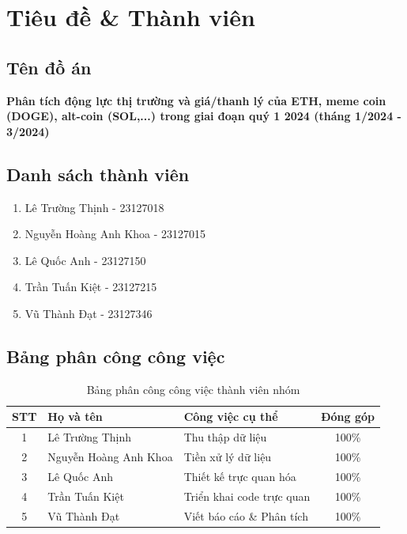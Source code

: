 \section{Tiêu đề \& Thành viên}

\subsection{Tên đồ án}
\textbf{Phân tích động lực thị trường và giá/thanh lý của ETH, meme coin (DOGE), alt-coin (SOL,...) trong giai đoạn quý 1 2024 (tháng 1/2024 - 3/2024)}

\subsection{Danh sách thành viên}
\begin{enumerate}
    \item Lê Trường Thịnh - 23127018
    \item Nguyễn Hoàng Anh Khoa - 23127015
    \item Lê Quốc Anh - 23127150
    \item Trần Tuấn Kiệt - 23127215
    \item Vũ Thành Đạt - 23127346
\end{enumerate}

\subsection{Bảng phân công công việc}
\begin{table}[H]
\centering
\begin{tabular}{|c|l|l|c|}
\hline
\textbf{STT} & \textbf{Họ và tên} & \textbf{Công việc cụ thể} & \textbf{Đóng góp} \\ \hline
1 & Lê Trường Thịnh & Thu thập dữ liệu & 100\% \\ \hline
2 & Nguyễn Hoàng Anh Khoa & Tiền xử lý dữ liệu & 100\% \\ \hline
3 & Lê Quốc Anh & Thiết kế trực quan hóa & 100\% \\ \hline
4 & Trần Tuấn Kiệt & Triển khai code trực quan & 100\% \\ \hline
5 & Vũ Thành Đạt & Viết báo cáo \& Phân tích & 100\% \\ \hline
\end{tabular}
\caption{Bảng phân công công việc thành viên nhóm}
\end{table}
